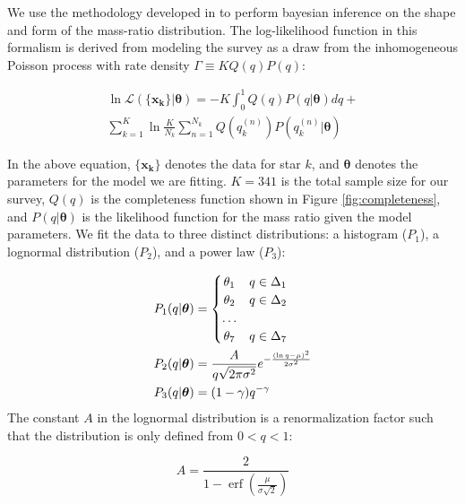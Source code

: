 \documentclass{emulateapj}
\renewcommand{\vec}[1]{\bm{#1}}
\DeclareMathOperator\erf{erf}
\begin{document}
We use the methodology developed in \citet{Foreman2014} to perform bayesian inference on the shape and form of the mass-ratio distribution. The log-likelihood function in this formalism is derived from modeling the survey as a draw from the inhomogeneous Poisson process with rate density $\Gamma \equiv KQ(q)P(q)$:

\begin{multline}
\ln{\mathcal{L}(\{\vec{x_k}\}| \vec{\theta})} = -K \int_0^1 Q(q)P(q|\vec{\theta})dq + \\ \sum_{k=1}^K \ln{\frac{K}{N_k} \sum_{n=1}^{N_k} Q(q_k^{(n)}) P(q_k^{(n)}|\vec{\theta})}
\label{eqn:money}
\end{multline}

In the above equation, $\{\vec{x_k}\}$ denotes the data for star $k$, and $\vec{\theta}$ denotes the parameters for the model we are fitting. $K=341$ is the total sample size for our survey, $Q(q)$ is the completeness function shown in Figure \ref{fig:completeness}, and $P(q|\vec{\theta})$ is the likelihood function for the mass ratio given the model parameters. We fit the data to three distinct distributions: a histogram ($P_1$), a lognormal distribution ($P_2$), and a power law ($P_3$):

\begin{align}
 P_1(q|\vec{\theta}) &= \begin{cases}
      \hfill \theta_1 \hfill & q \in \Delta_1 \\
      \hfill \theta_2 \hfill & q \in \Delta_2 \\
      \hfill \ldots \\
      \hfill \theta_7 \hfill & q \in \Delta_7
     \end{cases} \label{eqn:P1} \\
 P_2(q|\vec{\theta}) &= \frac{A}{q\sqrt{2\pi\sigma^2}} e^{-\frac{(\ln{q} - \mu)^2}{2\sigma^2}} \label{eqn:P2} \\
 P_3(q|\vec{\theta}) &= (1-\gamma)q^{-\gamma} \label{eqn:P3}
\end{align}
The constant $A$ in the lognormal distribution is a renormalization factor such that the distribution is only defined from $0 < q < 1$:

\begin{equation}
A = \frac{2}{1-\erf\left(\frac{\mu}{\sigma \sqrt{2}}\right)}
\end{equation}
\end{document}

